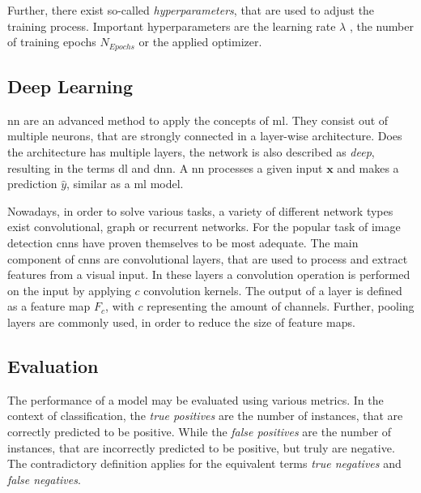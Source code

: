 Further, there exist so-called \textit{hyperparameters}, that are used to adjust the training process.
Important hyperparameters are the learning rate $\lambda$ , the number of training epochs $N_{Epochs}$ or the applied optimizer.


\subsection{Deep Learning}\label{ord:ch2:sec1:subsec2}

\gls{nn} are an advanced method to apply the concepts of \gls{ml}.
They consist out of multiple neurons, that are strongly connected in a layer-wise architecture.
Does the architecture has multiple layers, the network is also described as \textit{deep}, resulting in the terms \gls{dl} and \gls{dnn}.
A \gls{nn} processes a given input $\textbf{x}$ and makes a prediction $\hat{y}$, similar as a \gls{ml} model.

Nowadays, in order to solve various tasks, a variety of different network types exist \eg convolutional, graph or recurrent networks.
For the popular task of image detection \glspl{cnn} have proven themselves to be most adequate.
The main component of \glspl{cnn} are convolutional layers, that are used to process and extract features from a visual input.
In these layers a convolution operation is performed on the input by applying $c$ convolution kernels.
The output of a layer is defined as a feature map $F_c$, with $c$ representing the amount of channels.
Further, pooling layers are commonly used, in order to reduce the size of feature maps.


\subsection{Evaluation}\label{ord:ch2:sec1:subsec3}

The performance of a model may be evaluated using various metrics.
In the context of classification, the \textit{true positives} are the number of instances, that are correctly predicted to be positive.
While the \textit{false positives} are the number of instances, that are incorrectly predicted to be positive, but truly are negative.
The contradictory definition applies for the equivalent terms \textit{true negatives} and \textit{false negatives}.

